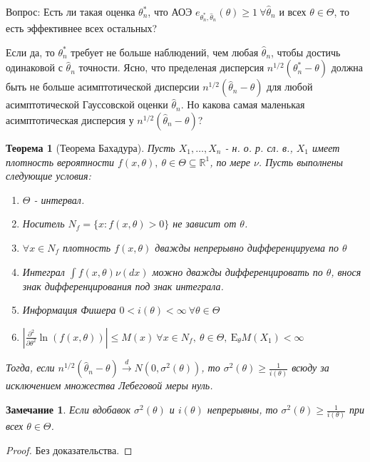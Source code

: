 \documentclass[12pt]{article}
\theoremstyle{basic_theorem}
\theoremstyle{name_theorem}
\newtheorem*{named_theorem}{Теорема}
\newtheorem*{remark}{Замечание}
\def\R{
    \mathbb{R}
}
\def\E{
    \mathrm{E}
}
\begin{document}
    Вопрос: Есть ли такая оценка $\theta^*_n$, что АОЭ $e_{\theta^*_n, \hat{\theta}_n}(\theta) \geq 1 \ \forall \hat{\theta}_n$
    и всех $\theta \in \Theta$, то есть эффективнее всех остальных?
    
    Если да, то $\theta^*_n$ требует не больше наблюдений, чем любая $\hat{\theta}_n$, чтобы достичь одинаковой с $\hat{\theta}_n$ точности.
    Ясно, что пределеная дисперсия $n^{1/2}(\theta^*_n - \theta)$ должна быть не больше асимптотической дисперсии
    $n^{1/2}(\hat{\theta}_n - \theta)$ для любой асимптотической Гауссовской оценки $\hat{\theta}_n$. Но
    какова самая маленькая асимптотическая дисперсия у $n^{1/2}(\hat{\theta}_n - \theta)$?
    
    \begin{named_theorem}[Теорема Бахадура]
        \label{th::bahadur}
        Пусть $X_1, \ldots, X_n$ - н. о. р. сл. в., $X_1$ имеет
        плотность вероятности $f(x, \theta),\ \theta \in \Theta \subseteq \R^1$,
        по мере $\nu$. Пусть выполнены следующие условия:
        \begin{enumerate}
            \item $\Theta$ - интервал.
            \item Носитель $N_f = \{x: f(x, \theta) > 0\}$ не зависит от $\theta$.
            \item \label{th::bahadur:density} $\forall x \in N_f$ плотность $f(x, \theta)$ дважды непрерывно
                дифференцируема по $\theta$
            \item \label{th::bahadur:integral} Интеграл $\int f(x, \theta)\nu(dx)$  можно
                дважды дифференцировать по $\theta$, внося знак
                дифференцирования под знак интеграла.
            \item Информация Фишера $0 < i(\theta) < \infty \ \forall \theta \in \Theta$
            \item \label{th::bahadur:second_partial} $|\frac{\partial^2}{\partial \theta^2} \ln(f(x, \theta))| \leq M(x) \ \forall x \in N_f, \ \theta \in \Theta, \ \E_\theta M(X_1) < \infty$ 
        \end{enumerate}
        Тогда, если $n^{1/2}(\hat{\theta}_n - \theta) \xrightarrow{d} N(0, \sigma^2(\theta))$,
        то $\sigma^2(\theta) \geq \frac{1}{i(\theta)}$ всюду за исключением
        множества Лебеговой меры нуль.
    \end{named_theorem}
    \begin{remark}
        Если вдобавок $\sigma^2(\theta)$ и $i(\theta)$ непрерывны,
        то $\sigma^2(\theta) \geq \frac{1}{i(\theta)}$ при всех $\theta \in \Theta$.
    \end{remark}
    \begin{proof}
        Без доказательства.
    \end{proof}
\end{document}

